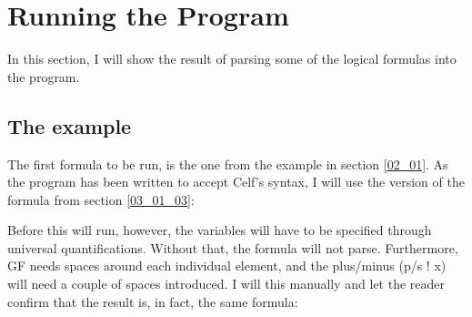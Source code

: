 \section{Running the Program}
\label{04_03}

In this section, I will show the result of parsing some of the logical formulas into the program.

\subsection{The example}

The first formula to be run, is the one from the example in section \ref{02_01}. As the program has been written to accept Celf's syntax, I will use the version of the formula from section \ref{03_01_03}:

\begin{texto}
\end{texto}

Before this will run, however, the variables will have to be specified through universal quantifications. Without that, the formula will not parse. Furthermore, GF needs spaces around each individual element, and the plus/minus (p/s ! x) will need a couple of spaces introduced. I will this manually and let the reader confirm that the result is, in fact, the same formula:

\begin{texto}
\end{texto}